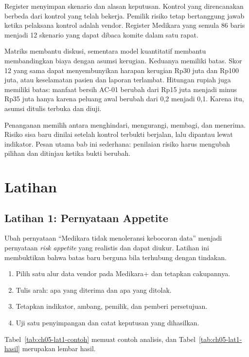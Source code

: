 Register menyimpan skenario dan alasan keputusan. Kontrol yang direncanakan berbeda dari kontrol yang
telah bekerja. Pemilik risiko tetap bertanggung jawab ketika pelaksana kontrol adalah vendor.
Register Medikara yang semula 86 baris menjadi 12 skenario yang dapat dibaca komite dalam satu rapat.

Matriks membantu diskusi, sementara model kuantitatif membantu membandingkan biaya dengan asumsi
kerugian. Keduanya memiliki batas. Skor 12 yang sama dapat menyembunyikan harapan kerugian Rp30 juta
dan Rp100 juta, atau keselamatan pasien dan laporan terlambat. Hitungan rupiah juga memiliki batas:
manfaat bersih AC-01 berubah dari Rp15 juta menjadi minus Rp35 juta hanya karena peluang awal berubah
dari 0,2 menjadi 0,1. Karena itu, asumsi ditulis terbuka dan diuji.

Penanganan memilih antara menghindari, mengurangi, membagi, dan menerima. Risiko sisa baru dinilai
setelah kontrol terbukti berjalan, lalu dipantau lewat indikator. Pesan utama bab ini sederhana:
penilaian risiko harus mengubah pilihan dan ditinjau ketika bukti berubah.

\section{Latihan}

\subsection*{Latihan 1: Pernyataan Appetite}

Ubah pernyataan ``Medikara tidak menoleransi kebocoran data'' menjadi pernyataan \textit{risk
appetite} yang realistis dan dapat diukur. Latihan ini membuktikan bahwa batas baru berguna bila
terhubung dengan tindakan.

\begin{enumerate}
  \item Pilih satu alur data vendor pada Medikara+ dan tetapkan cakupannya.
  \item Tulis arah: apa yang diterima dan apa yang ditolak.
  \item Tetapkan indikator, ambang, pemilik, dan pemberi persetujuan.
  \item Uji satu penyimpangan dan catat keputusan yang dihasilkan.
\end{enumerate}

Tabel~\ref{tab:ch05-lat1-contoh} memuat contoh analisis, dan Tabel~\ref{tab:ch05-lat1-hasil} merupakan
lembar hasil.

